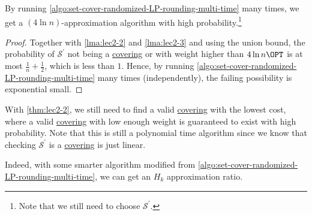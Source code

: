 \begin{theorem}\label{thm:lec2-2}
	By running \autoref{algo:set-cover-randomized-LP-rounding-multi-time} many times, we get a \((4\ln n)\)-approximation algorithm with high probability.\footnote{Note that we still need to choose \(\mathcal{S}^\prime \).}
\end{theorem}
\begin{proof}
	Together with \autoref{lma:lec2-2} and \autoref{lma:lec2-3} and using the union bound, the probability of \(\mathcal{S} ^\prime \) not being a \hyperref[def:covering]{covering} or with weight higher than \(4\ln n\OPT\) is at most \(\frac{1}{n} + \frac{1}{2}\), which is less than \(1\). Hence, by running \autoref{algo:set-cover-randomized-LP-rounding-multi-time} many times (independently), the failing possibility is exponential small.
\end{proof}

\begin{note}
	With \autoref{thm:lec2-2}, we still need to find a valid \hyperref[def:covering]{covering} with the lowest cost, where a valid \hyperref[def:covering]{covering} with low enough weight is guaranteed to exist with high probability. Note that this is still a polynomial time algorithm since we know that checking \(\mathcal{S} ^\prime \) is a \hyperref[def:covering]{covering} is just linear.
\end{note}

\begin{remark}
	Indeed, with some smarter algorithm modified from \autoref{algo:set-cover-randomized-LP-rounding-multi-time}, we can get an \(H_k\) approximation ratio.
\end{remark}